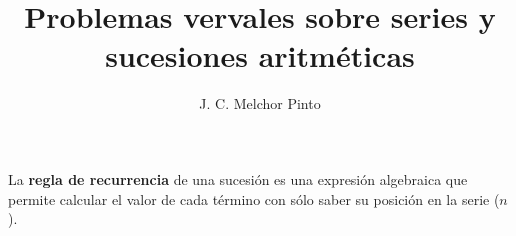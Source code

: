 \documentclass[12pt]{guia}
\title{Problemas vervales sobre series y sucesiones aritméticas}
\author{J. C. Melchor Pinto}
\begin{document}
\pagestyle{headandfoot}
\addpoints
\INFO
\printanswers
\vspace{-2em}
\begin{multicols}{2}
    
    
    
    
\end{multicols}
\begin{importantbox}
    La \textbf{regla de recurrencia} de una sucesión es una expresión algebraica que permite calcular el valor de cada término con sólo saber su posición en la serie ($n$).
\end{importantbox}
\begin{questions}
    \questionboxed[5]{}
    \questionboxed[5]{}
    \questionboxed[5]{}
    \questionboxed[5]{}
    \questionboxed[5]{}
    \questionboxed[5]{}
    \questionboxed[5]{}
    \questionboxed[5]{}
    \questionboxed[5]{}
\end{questions}
\end{document}
